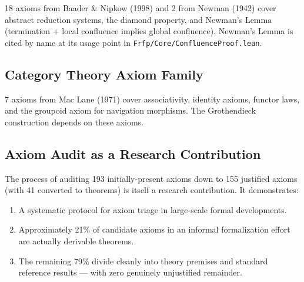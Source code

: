 18 axioms from Baader \& Nipkow (1998) and 2 from Newman (1942) cover abstract
reduction systems, the diamond property, and Newman's Lemma (termination + local
confluence implies global confluence). Newman's Lemma is cited by name at its
usage point in \texttt{Frfp/Core/ConfluenceProof.lean}.

\subsection{Category Theory Axiom Family}

7 axioms from Mac Lane (1971) cover associativity, identity axioms, functor laws,
and the groupoid axiom for navigation morphisms. The Grothendieck construction
depends on these axioms.

\subsection{Axiom Audit as a Research Contribution}

The process of auditing 193 initially-present axioms down to 155 justified axioms
(with 41 converted to theorems) is itself a research contribution. It demonstrates:

\begin{enumerate}
  \item A systematic protocol for axiom triage in large-scale formal developments.
  \item Approximately 21\% of candidate axioms in an informal formalization
        effort are actually derivable theorems.
  \item The remaining 79\% divide cleanly into theory premises and standard
        reference results --- with zero genuinely unjustified remainder.
\end{enumerate}
